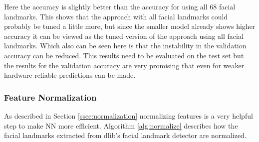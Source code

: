 Here the accuracy is slightly better than the accuracy for using all 68 facial landmarks. 
This shows that the approach with all facial landmarks could probably be tuned a little more, but since the smaller model already shows higher accuracy it can be viewed as the tuned version of the approach using all facial landmarks.
Which also can be seen here is that the instability in the validation accuracy can be reduced.
This results need to be evaluated on the test set but the results for the validation accuracy are very promising that even for weaker hardware reliable predictions can be made.

\subsubsection{Feature Normalization}\label{ssec:normalize}
As described in Section \ref{ssec:normalization} normalizing features is a very helpful step to make NN more efficient.
Algorithm \ref{alg:normalize} describes how the facial landmarks extracted from dlib's facial landmark detector
are normalized.

